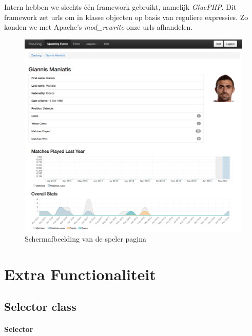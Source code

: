 \documentclass[11pt]{article}
\begin{document}
Intern hebben we slechts \'e\'en framework gebruikt, namelijk \emph{GluePHP}. Dit framework zet urls om in klasse objecten op basis van reguliere expressies. Zo konden we met Apache's \emph{mod\_rewrite} onze urls afhandelen.

\begin{figure}[h!]
	\begin{center}
	\includegraphics[scale=0.29]{player.png}

	\caption{Schermafbeelding van de speler pagina}
	\label{fig:speler}
	\end{center}
\end{figure}




\section{Extra Functionaliteit}


\subsection{Selector class}




\paragraph{Selector}
\end{document}
